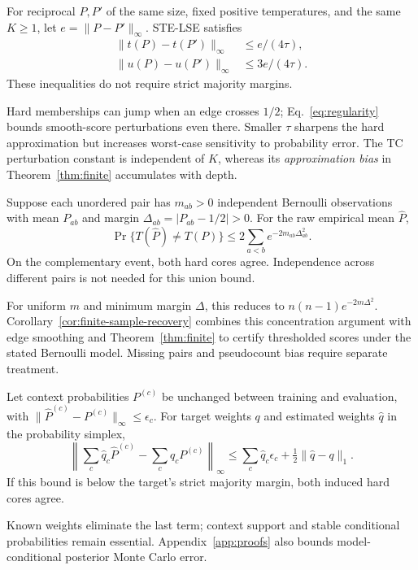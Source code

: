 \begin{proposition}\label{prop:lipschitz}
For reciprocal $P,P'$ of the same size, fixed positive temperatures, and the same $K\ge1$, let $e=\|P-P'\|_\infty$. STE-LSE satisfies
\begin{equation}\label{eq:regularity}
\begin{split}
\|t(P)-t(P')\|_\infty&\le e/(4\tau),\\
\|u(P)-u(P')\|_\infty&\le 3e/(4\tau).
\end{split}
\end{equation}
These inequalities do not require strict majority margins.
\end{proposition}
Hard memberships can jump when an edge crosses $1/2$; Eq.~\eqref{eq:regularity} bounds smooth-score perturbations even there. Smaller $\tau$ sharpens the hard approximation but increases worst-case sensitivity to probability error. The TC perturbation constant is independent of $K$, whereas its \emph{approximation bias} in Theorem~\ref{thm:finite} accumulates with depth.

\begin{proposition}\label{prop:sample}
Suppose each unordered pair has $m_{ab}>0$ independent Bernoulli observations with mean $P_{ab}$ and margin $\Delta_{ab}=|P_{ab}-1/2|>0$. For the raw empirical mean $\widehat P$,
\begin{equation}\label{eq:sample}
\Pr\{T(\widehat P)\ne T(P)\}\le 2\sum_{a<b}e^{-2m_{ab}\Delta_{ab}^2}.
\end{equation}
On the complementary event, both hard cores agree. Independence across different pairs is not needed for this union bound.
\end{proposition}
For uniform $m$ and minimum margin $\Delta$, this reduces to $n(n-1)e^{-2m\Delta^2}$. Corollary~\ref{cor:finite-sample-recovery} combines this concentration argument with edge smoothing and Theorem~\ref{thm:finite} to certify thresholded scores under the stated Bernoulli model. Missing pairs and pseudocount bias require separate treatment.

\begin{proposition}\label{prop:mixture}
Let context probabilities $P^{(c)}$ be unchanged between training and evaluation, with $\|\widehat P^{(c)}-P^{(c)}\|_\infty\le\epsilon_c$. For target weights $q$ and estimated weights $\widehat q$ in the probability simplex,
\begin{equation}\label{eq:mixture}
\left\|\sum_c\widehat q_c\widehat P^{(c)}-\sum_cq_cP^{(c)}\right\|_\infty
\le \sum_c\widehat q_c\epsilon_c+\tfrac12\|\widehat q-q\|_1.
\end{equation}
If this bound is below the target's strict majority margin, both induced hard cores agree.
\end{proposition}
Known weights eliminate the last term; context support and stable conditional probabilities remain essential. Appendix~\ref{app:proofs} also bounds model-conditional posterior Monte Carlo error.


